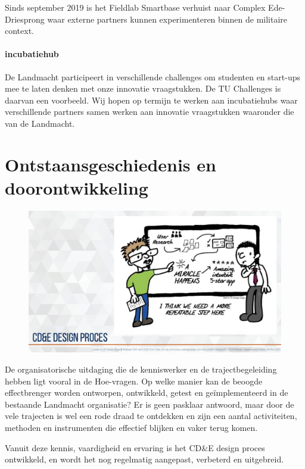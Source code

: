 \documentclass[
]{book}
\begin{document}
Sinds september 2019 is het Fieldlab Smartbase verhuist naar Complex Ede-Driesprong waar externe partners kunnen experimenteren binnen de militaire context.

\hypertarget{incubatiehub}{%
\subsubsection{incubatiehub}\label{incubatiehub}}

De Landmacht participeert in verschillende challenges om studenten en start-ups mee te laten denken met onze innovatie vraagstukken. De TU Challenges is daarvan een voorbeeld. Wij hopen op termijn te werken aan incubatiehubs waar verschillende partners samen werken aan innovatie vraagstukken waaronder die van de Landmacht.

\hypertarget{cde-process}{%
\chapter{Ontstaansgeschiedenis en doorontwikkeling}\label{cde-process}}

\begin{figure}

{\centering \includegraphics[width=0.5\linewidth]{data/keynote-slides/20200430-CDE-Designprocess/20200430-CDE-Designprocess.018} 

}

\caption{ }\label{fig:unnamed-chunk-14}
\end{figure}

De organisatorische uitdaging die de kenniswerker en de trajectbegeleiding hebben ligt vooral in de Hoe-vragen. Op welke manier kan de beoogde effectbrenger worden ontworpen, ontwikkeld, getest en geïmplementeerd in de bestaande Landmacht organisatie? Er is geen pasklaar antwoord, maar door de vele trajecten is wel een rode draad te ontdekken en zijn een aantal activiteiten, methoden en instrumenten die effectief blijken en vaker terug komen.

Vanuit deze kennis, vaardigheid en ervaring is het CD\&E design proces ontwikkeld, en wordt het nog regelmatig aangepast, verbeterd en uitgebreid.
\end{document}
